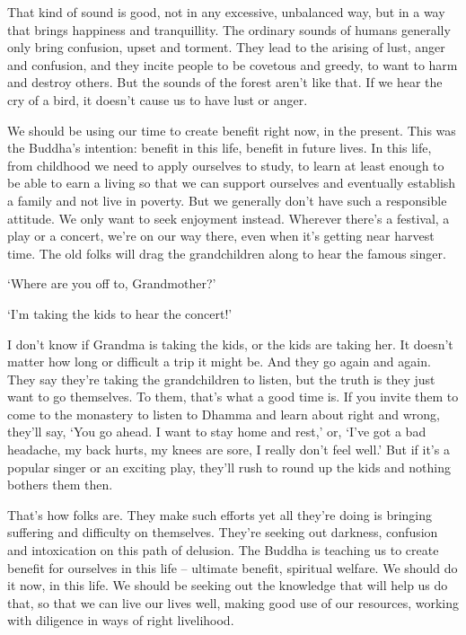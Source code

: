 That kind of sound is good, not in any excessive, unbalanced way, but in a way that brings happiness and tranquillity. The ordinary sounds of humans generally only bring confusion, upset and torment. They lead to the arising of lust, anger and confusion, and they incite people to be covetous and greedy, to want to harm and destroy others. But the sounds of the forest aren't like that. If we hear the cry of a bird, it doesn't cause us to have lust or anger. 

We should be using our time to create benefit right now, in the present. This was the Buddha's intention: benefit in this life, benefit in future lives. In this life, from childhood we need to apply ourselves to study, to learn at least enough to be able to earn a living so that we can support ourselves and eventually establish a family and not live in poverty. But we generally don't have such a responsible attitude. We only want to seek enjoyment instead. Wherever there's a festival, a play or a concert, we're on our way there, even when it's getting near harvest time. The old folks will drag the grandchildren along to hear the famous singer. 

`Where are you off to, Grandmother?' 

`I'm taking the kids to hear the concert!' 

I don't know if Grandma is taking the kids, or the kids are taking her. It doesn't matter how long or difficult a trip it might be. And they go again and again. They say they're taking the grandchildren to listen, but the truth is they just want to go themselves. To them, that's what a good time is. If you invite them to come to the monastery to listen to Dhamma and learn about right and wrong, they'll say, `You go ahead. I want to stay home and rest,' or, `I've got a bad headache, my back hurts, my knees are sore, I really don't feel well.' But if it's a popular singer or an exciting play, they'll rush to round up the kids and nothing bothers them then. 

That's how folks are. They make such efforts yet all they're doing is bringing suffering and difficulty on themselves. They're seeking out darkness, confusion and intoxication on this path of delusion. The Buddha is teaching us to create benefit for ourselves in this life -- ultimate benefit, spiritual welfare. We should do it now, in this life. We should be seeking out the knowledge that will help us do that, so that we can live our lives well, making good use of our resources, working with diligence in ways of right livelihood. 

